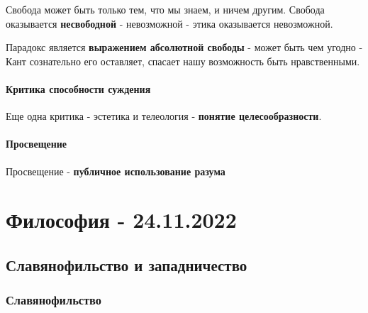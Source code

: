 \documentclass{article}
\begin{document}
\begin{flushleft}
Свобода может быть только тем, что мы знаем, и ничем другим. Свобода оказывается \textbf{несвободной} - невозможной - этика оказывается невозможной.

Парадокс является \textbf{выражением абсолютной свободы} - может быть чем угодно - Кант сознательно его оставляет, спасает нашу возможность быть нравственными.

\paragraph{Критика способности суждения} Еще одна критика - эстетика и телеология - \textbf{понятие целесообразности}.

\paragraph{Просвещение} Просвещение - \textbf{публичное использование разума}

\end{flushleft}

\section{Философия - 24.11.2022}

\subsection{Славянофильство и западничество}

\subsubsection{Славянофильство}
\end{document}
